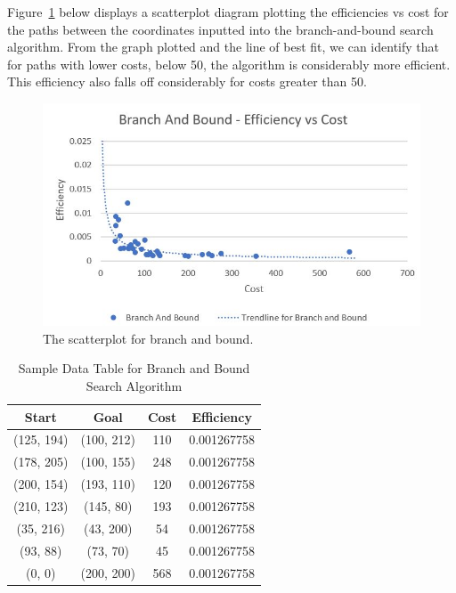 \documentclass[11pt,oneside]{article}
\begin{document}
Figure~\ref{fig:BnBEvC} below displays a scatterplot diagram plotting the efficiencies vs cost for the paths between the coordinates inputted into the branch-and-bound search algorithm. From the graph plotted and the line of best fit, we can identify that for paths with lower costs, below 50, the algorithm is considerably more efficient. This efficiency also falls off considerably for costs greater than 50.

\begin{figure}[H]
\centering
  \includegraphics[scale=0.8]{BnB efficiency vs cost.JPG}
  \caption{The scatterplot for branch and bound.}
  \label{fig:BnBEvC}
\end{figure} 

\begin{table}[H]
    \centering
    \begin{tabular}{|c|c|c|c|}
        Start        & Goal       & Cost & Efficiency \\ \hline
        (125, 194)   & (100, 212) & 110 & 0.001267758 \\
        (178, 205)   & (100, 155) & 248 & 0.001267758 \\
        (200, 154)   & (193, 110) & 120 & 0.001267758 \\
        (210, 123)   & (145, 80)  & 193 & 0.001267758 \\
        (35, 216)    & (43, 200)  & 54 & 0.001267758 \\
        (93, 88)     & (73, 70)   & 45 & 0.001267758 \\
        (0, 0)       & (200, 200) & 568 & 0.001267758 \\
    \end{tabular}
    \caption{Sample Data Table for Branch and Bound Search Algorithm}
    \label{tab:my_label}
\end{table}
\end{document}
